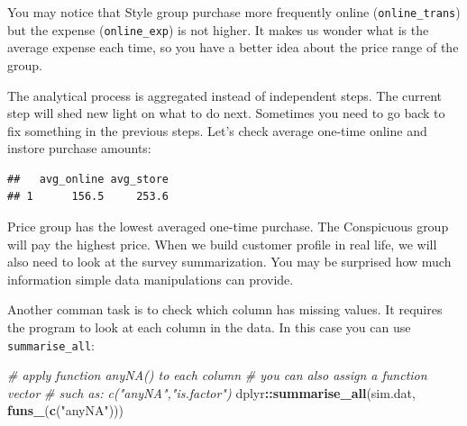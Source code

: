 \documentclass[12pt,]{krantz}
\makeatletter
\newenvironment{Shaded}{\begin{snugshade}}{\end{snugshade}}
\newcommand{\CommentTok}[1]{\textcolor[rgb]{0.37,0.37,0.37}{\textit{#1}}}
\newcommand{\DataTypeTok}[1]{\textcolor[rgb]{0.27,0.27,0.27}{#1}}
\newcommand{\DecValTok}[1]{\textcolor[rgb]{0.06,0.06,0.06}{#1}}
\newcommand{\KeywordTok}[1]{\textcolor[rgb]{0.27,0.27,0.27}{\textbf{#1}}}
\newcommand{\NormalTok}[1]{#1}
\newcommand{\OperatorTok}[1]{\textcolor[rgb]{0.43,0.43,0.43}{\textbf{#1}}}
\newcommand{\StringTok}[1]{\textcolor[rgb]{0.5,0.5,0.5}{#1}}
\newenvironment{kframe}{%
\medskip{}
\setlength{\fboxsep}{.8em}
 \def\at@end@of@kframe{}%
 \ifinner\ifhmode%
  \def\at@end@of@kframe{\end{minipage}}%
  \begin{minipage}{\columnwidth}%
 \fi\fi%
 \def\FrameCommand##1{\hskip\@totalleftmargin \hskip-\fboxsep
 \colorbox{shadecolor}{##1}\hskip-\fboxsep
     \hskip-\linewidth \hskip-\@totalleftmargin \hskip\columnwidth}%
 \MakeFramed {\advance\hsize-\width
   \@totalleftmargin\z@ \linewidth\hsize
   \@setminipage}}%
 {\par\unskip\endMakeFramed%
 \at@end@of@kframe}
\renewenvironment{Shaded}{\begin{kframe}}{\end{kframe}}
\makeatother
\begin{document}
You may notice that Style group purchase more frequently online (\texttt{online\_trans}) but the expense (\texttt{online\_exp}) is not higher. It makes us wonder what is the average expense each time, so you have a better idea about the price range of the group.

The analytical process is aggregated instead of independent steps. The current step will shed new light on what to do next. Sometimes you need to go back to fix something in the previous steps. Let's check average one-time online and instore purchase amounts:

\begin{Shaded}
\end{Shaded}

\begin{verbatim}
##   avg_online avg_store
## 1      156.5     253.6
\end{verbatim}

Price group has the lowest averaged one-time purchase. The Conspicuous group will pay the highest price. When we build customer profile in real life, we will also need to look at the survey summarization. You may be surprised how much information simple data manipulations can provide.

Another comman task is to check which column has missing values. It requires the program to look at each column in the data. In this case you can use \texttt{summarise\_all}:

\begin{Shaded}
\begin{Highlighting}[]
\CommentTok{# apply function anyNA() to each column}
\CommentTok{# you can also assign a function vector }
\CommentTok{# such as: c("anyNA","is.factor")}
\NormalTok{dplyr}\OperatorTok{::}\KeywordTok{summarise_all}\NormalTok{(sim.dat, }\KeywordTok{funs_}\NormalTok{(}\KeywordTok{c}\NormalTok{(}\StringTok{"anyNA"}\NormalTok{)))}
\end{Highlighting}
\end{Shaded}
\end{document}
